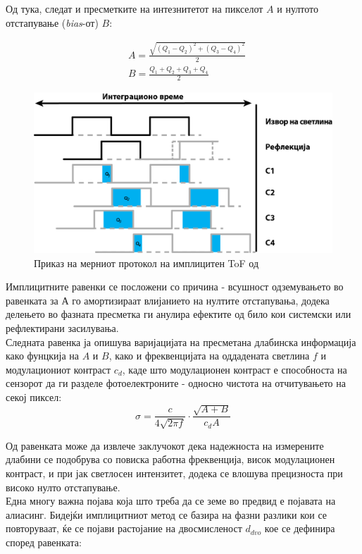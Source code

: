 \documentclass[11pt]{article}
\begin{document}
		  Од тука, следат и пресметките на интезнитетот на пикселот $A$ и нултото отстапување (\textit{bias}-от) $B$:

      \begin{align}
        & A = \frac{\sqrt{(Q_1 - Q_2)^2  + (Q_3 - Q_4)^2}}{2} \nonumber \\
  		  & B = \frac{Q_1 + Q_2 + Q_3 + Q_4}{2}
      \end{align}


		  \begin{figure}[H]
			  \includegraphics[width=0.75\linewidth]{./images/CWToF.png}
			  \centering
			  \caption{Приказ на мерниот протокол на имплицитен ToF од \cite{tofwhitepaper}}
			  \label{fig:CWToF.png}
			\end{figure}

		    Имплицитните равенки се посложени со причина - всушност одземувањето во равенката за А го амортизираат влијанието на нултите отстапувања, додека делењето во фазната пресметка ги анулира ефектите од било кои системски или рефлектирани засилувања.\\ %
		    Следната равенка ја опишува варијацијата на пресметана длабинска информација како фунцкија на $A$ и $B$, како и фреквенцијата на оддадената светлина $f$ и модулациониот контраст $c_d$, каде што модулационен контраст е способноста на сензорот да ги разделе фотоелектроните - односно чистота на отчитувањето на секој пиксел:
        \begin{equation}
		       \sigma = \frac{c}{4\sqrt{2\pi f}} \cdot \frac{\sqrt{A+B}}{c_d A}
        \end{equation}

        Од равенката може да извлече заклучокот дека надежноста на измерените длабини се подобрува со повиска работна фреквенција, висок модулационен контраст, и при јак светлосен интензитет, додека се влошува прецизноста при високо нулто отстапување.
		    \\
		    Една многу важна појава која што треба да се земе во предвид е појавата на алиасинг. Бидејќи имплицитниот метод се базира на фазни разлики кои се повторуваат, ќе се појави растојание на двосмисленост $d_{dvo}$ кое се дефинира според равенката:
\end{document}

